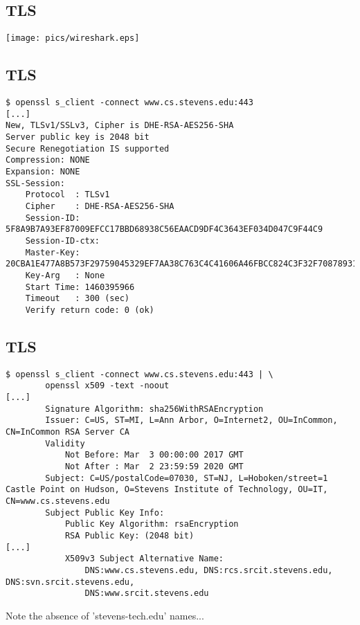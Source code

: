 \documentclass[xga]{xdvislides}
\begin{document}
\subsection{TLS}
\begin{center}
	\texttt{[image: pics/wireshark.eps]}
\end{center}

\subsection{TLS}
\begin{verbatim}
$ openssl s_client -connect www.cs.stevens.edu:443
[...]
New, TLSv1/SSLv3, Cipher is DHE-RSA-AES256-SHA
Server public key is 2048 bit
Secure Renegotiation IS supported
Compression: NONE
Expansion: NONE
SSL-Session:
    Protocol  : TLSv1
    Cipher    : DHE-RSA-AES256-SHA
    Session-ID: 5F8A9B7A93EF87009EFCC17BBD68938C56EAACD9DF4C3643EF034D047C9F44C9
    Session-ID-ctx: 
    Master-Key: 20CBA1E477A8B573F29759045329EF7AA38C763C4C41606A46FBCC824C3F32F708789311E7B4275470E35CF09518FDCD
    Key-Arg   : None
    Start Time: 1460395966
    Timeout   : 300 (sec)
    Verify return code: 0 (ok)
\end{verbatim}

\subsection{TLS}
\smallish
\begin{verbatim}
$ openssl s_client -connect www.cs.stevens.edu:443 | \
        openssl x509 -text -noout
[...]
        Signature Algorithm: sha256WithRSAEncryption
        Issuer: C=US, ST=MI, L=Ann Arbor, O=Internet2, OU=InCommon, CN=InCommon RSA Server CA
        Validity
            Not Before: Mar  3 00:00:00 2017 GMT
            Not After : Mar  2 23:59:59 2020 GMT
        Subject: C=US/postalCode=07030, ST=NJ, L=Hoboken/street=1 Castle Point on Hudson, O=Stevens Institute of Technology, OU=IT, CN=www.cs.stevens.edu
        Subject Public Key Info:
            Public Key Algorithm: rsaEncryption
            RSA Public Key: (2048 bit)
[...]
            X509v3 Subject Alternative Name: 
                DNS:www.cs.stevens.edu, DNS:rcs.srcit.stevens.edu, DNS:svn.srcit.stevens.edu,
                DNS:www.srcit.stevens.edu
\end{verbatim}
\Normalsize
Note the absence of 'stevens-tech.edu' names...

% 
% 
% 
% 
% 
 
\end{document}
